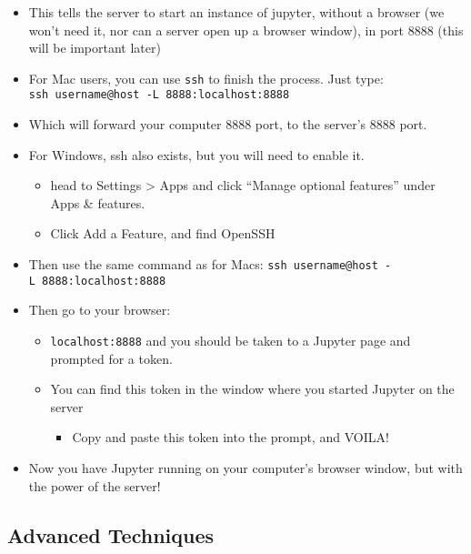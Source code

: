 \documentclass[10pt,parskip=half,
	toc=sectionentrywithdots,
	bibliography=totocnumbered,
	captions=tableheading,numbers=noendperiod]{scrartcl}
\providecommand{\tightlist}{%
  \setlength{\itemsep}{0pt}\setlength{\parskip}{0pt}}
\begin{document}
\begin{itemize}
\item
  This tells the server to start an instance of jupyter, without a
  browser (we won't need it, nor can a server open up a browser window),
  in port 8888 (this will be important later)
\item
  For Mac users, you can use \texttt{ssh} to finish the process. Just
  type: \texttt{ssh\ username@host\ -L\ 8888:localhost:8888}
\item
  Which will forward your computer 8888 port, to the server's 8888 port.
\item
  For Windows, ssh also exists, but you will need to enable it.

  \begin{itemize}
  \tightlist
  \item
    head to Settings \textgreater{} Apps and click ``Manage optional
    features'' under Apps \& features.
  \item
    Click Add a Feature, and find OpenSSH
  \end{itemize}
\item
  Then use the same command as for Macs:
  \texttt{ssh\ username@host\ -L\ 8888:localhost:8888}
\item
  Then go to your browser:

  \begin{itemize}
  \tightlist
  \item
    \texttt{localhost:8888} and you should be taken to a Jupyter page
    and prompted for a token.
  \item
    You can find this token in the window where you started Jupyter on
    the server

    \begin{itemize}
    \tightlist
    \item
      Copy and paste this token into the prompt, and VOILA!
    \end{itemize}
  \end{itemize}
\item
  Now you have Jupyter running on your computer's browser window, but
  with the power of the server!
\end{itemize}

\hypertarget{advanced-techniques}{%
\subsection{Advanced Techniques}\label{advanced-techniques}}
\end{document}
